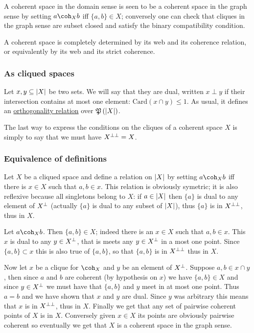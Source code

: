 A coherent space in the domain sense is seen to be a coherent space in
the graph sense by setting \(a\coh_X b\) iff \(\{a,b\}\in X\);
conversely one can check that cliques in the graph sense are subset
closed and satisfy the binary compatibility condition.

A coherent space is completely determined by its web and its coherence
relation, or equivalently by its web and its strict coherence.

\subsubsection{As cliqued spaces}\label{as-cliqued-spaces}

\begin{definition}[Duality]
Let $x, y\subseteq \left|X\right|$ be two sets. We will say that they are dual, written $x\perp y$ if their intersection contains at most one element: $\mathrm{Card}(x\cap y)\leq 1$. As usual, it defines an \hyperref[orthogonality-relation]{orthogonality relation} over $\mathfrak{P}\left(\left|X\right|\right)$.
\end{definition}

The last way to express the conditions on the cliques of a coherent
space \(X\) is simply to say that we must have \(X^{\bot\bot} = X\).

\subsubsection{Equivalence of definitions}\label{equivalence-of-definitions}

Let \(X\) be a cliqued space and define a relation on \(\left|X\right|\) by
setting \(a\coh_X b\) iff there is \(x\in X\) such that \(a, b\in x\).
This relation is obviously symetric; it is also reflexive because all
singletons belong to \(X\): if \(a\in \left|X\right|\) then \(\{a\}\) is dual to
any element of \(X^\bot\) (actually \(\{a\}\) is dual to any subset of
\(\left|X\right|\)), thus \(\{a\}\) is in \(X^{\bot\bot}\), thus in \(X\).

Let \(a\coh_X b\). Then \(\{a,b\}\in X\); indeed there is an \(x\in X\)
such that \(a, b\in x\). This \(x\) is dual to any \(y\in X^\bot\), that
is meets any \(y\in X^\bot\) in a most one point. Since
\(\{a,b\}\subset x\) this is also true of \(\{a,b\}\), so that
\(\{a,b\}\) is in \(X^{\bot\bot}\) thus in \(X\).

Now let \(x\) be a clique for \(\coh_X\) and \(y\) be an element of
\(X^\bot\). Suppose \(a, b\in x\cap y\), then since \(a\) and \(b\) are
coherent (by hypothesis on \(x\)) we have \(\{a,b\}\in X\) and since
\(y\in X^\bot\) we must have that \(\{a,b\}\) and \(y\) meet in at most
one point. Thus \(a = b\) and we have shown that \(x\) and \(y\) are
dual. Since \(y\) was arbitrary this means that \(x\) is in
\(X^{\bot\bot}\), thus in \(X\). Finally we get that any set of pairwise
coherent points of \(X\) is in \(X\). Conversely given \(x\in X\) its
points are obviously pairwise coherent so eventually we get that \(X\)
is a coherent space in the graph sense.

